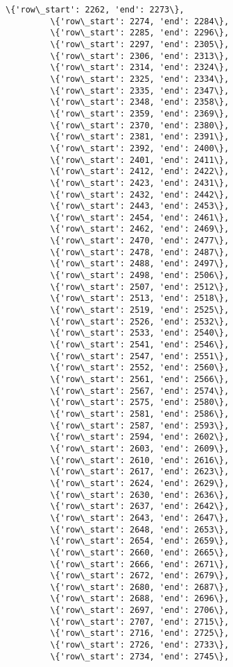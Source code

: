 \documentclass[11pt]{article}
\begin{document}
\begin{Verbatim}[commandchars=\\\{\}]
         \{'row\_start': 2262, 'end': 2273\},
         \{'row\_start': 2274, 'end': 2284\},
         \{'row\_start': 2285, 'end': 2296\},
         \{'row\_start': 2297, 'end': 2305\},
         \{'row\_start': 2306, 'end': 2313\},
         \{'row\_start': 2314, 'end': 2324\},
         \{'row\_start': 2325, 'end': 2334\},
         \{'row\_start': 2335, 'end': 2347\},
         \{'row\_start': 2348, 'end': 2358\},
         \{'row\_start': 2359, 'end': 2369\},
         \{'row\_start': 2370, 'end': 2380\},
         \{'row\_start': 2381, 'end': 2391\},
         \{'row\_start': 2392, 'end': 2400\},
         \{'row\_start': 2401, 'end': 2411\},
         \{'row\_start': 2412, 'end': 2422\},
         \{'row\_start': 2423, 'end': 2431\},
         \{'row\_start': 2432, 'end': 2442\},
         \{'row\_start': 2443, 'end': 2453\},
         \{'row\_start': 2454, 'end': 2461\},
         \{'row\_start': 2462, 'end': 2469\},
         \{'row\_start': 2470, 'end': 2477\},
         \{'row\_start': 2478, 'end': 2487\},
         \{'row\_start': 2488, 'end': 2497\},
         \{'row\_start': 2498, 'end': 2506\},
         \{'row\_start': 2507, 'end': 2512\},
         \{'row\_start': 2513, 'end': 2518\},
         \{'row\_start': 2519, 'end': 2525\},
         \{'row\_start': 2526, 'end': 2532\},
         \{'row\_start': 2533, 'end': 2540\},
         \{'row\_start': 2541, 'end': 2546\},
         \{'row\_start': 2547, 'end': 2551\},
         \{'row\_start': 2552, 'end': 2560\},
         \{'row\_start': 2561, 'end': 2566\},
         \{'row\_start': 2567, 'end': 2574\},
         \{'row\_start': 2575, 'end': 2580\},
         \{'row\_start': 2581, 'end': 2586\},
         \{'row\_start': 2587, 'end': 2593\},
         \{'row\_start': 2594, 'end': 2602\},
         \{'row\_start': 2603, 'end': 2609\},
         \{'row\_start': 2610, 'end': 2616\},
         \{'row\_start': 2617, 'end': 2623\},
         \{'row\_start': 2624, 'end': 2629\},
         \{'row\_start': 2630, 'end': 2636\},
         \{'row\_start': 2637, 'end': 2642\},
         \{'row\_start': 2643, 'end': 2647\},
         \{'row\_start': 2648, 'end': 2653\},
         \{'row\_start': 2654, 'end': 2659\},
         \{'row\_start': 2660, 'end': 2665\},
         \{'row\_start': 2666, 'end': 2671\},
         \{'row\_start': 2672, 'end': 2679\},
         \{'row\_start': 2680, 'end': 2687\},
         \{'row\_start': 2688, 'end': 2696\},
         \{'row\_start': 2697, 'end': 2706\},
         \{'row\_start': 2707, 'end': 2715\},
         \{'row\_start': 2716, 'end': 2725\},
         \{'row\_start': 2726, 'end': 2733\},
         \{'row\_start': 2734, 'end': 2745\},

\end{Verbatim}
\end{document}
